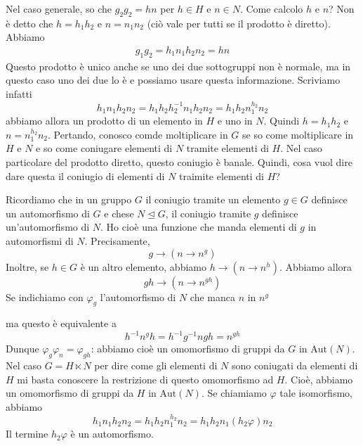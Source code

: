 \documentclass[a4paper]{article}
\begin{document}
Nel caso generale, so che \(g_2g_2 = hn\)
per \(h\in H\) e \(n\in N\).
Come calcolo \(h\) e \(n\)? Non è detto che \(h=h_1h_2\)
e \(n=n_1n_2\) (ciò vale per tutti se il prodotto è diretto).
Abbiamo
\begin{align*}
    g_1g_2 = h_1n_1h_2n_2 = hn
\end{align*}
Questo prodotto è unico anche se uno dei due sottogruppi non è normale,
ma in questo caso uno dei due lo è e possiamo usare questa informazione.
Scriviamo infatti
\[
    h_1 n_1 h_2 n_2 = h_1h_2h_2^{-1} n_1 h_2 n_2
    = h_1 h_2 n_1^{h_2} n_2
\]
abbiamo allora un prodotto di un elemento in \(H\) e uno in \(N\).
Quindi \(h = h_1h_2\) e \(n = n_1^{h_2}n_2\).
Pertando, conosco comde moltiplicare in \(G\)
se so come moltiplicare in \(H\) e \(N\)
e so come coniugare elementi di \(N\) tramite elementi
di \(H\).
Nel caso particolare del prodotto diretto, questo coniugio è banale.
Quindi, cosa vuol dire dare questa il coniugio
di elementi di \(N\) traimite elementi di \(H\)?

Ricordiamo che in un gruppo \(G\) il coniugio
tramite un elemento \(g\in G\) definisce un automorfismo
di \(G\) e chese \(N \unlhd G\), il coniugio tramite \(g\)
definisce un'automorfismo di \(N\).
Ho cioè una funzione che manda elementi di \(g\)
in automorfismi di \(N\).
Precisamente,
\[
    g\to (n \to n^g)
\]
Inoltre, se \(h\in G\) è un altro elemento, abbiamo
\(h \to (n \to n^h)\).
Abbiamo allora
\[
    gh \to (n \to n^{gh})
\]
Se indichiamo con \(\varphi_g\) l'automorfismo
di \(N\) che manca \(n\) in \(n^g\)

\begin{center}
\end{center}
ma questo è equivalente a
\[
    h^{-1} n^g h = h^{-1} g^{-1} ngh = n^{gh}
\]
Dunque \(\varphi_g \varphi_n = \varphi_{gh}\):
abbiamo cioè un omomorfismo di gruppi da \(G\) in \(\text{Aut}(N)\).
Nel caso \(G = H \ltimes N\)
per dire come gli elementi di \(N\) sono coniugati da elementi di \(H\)
mi basta conoscere la restrizione di questo omomorfismo ad \(H\).
Cioè, abbiamo un omomorfismo di gruppi da \(H\) in \(\text{Aut}(N)\).
Se chiamiamo \(\varphi\) tale isomorfismo, abbiamo
\[
    h_1n_1h_2n_2 = h_1h_2n_1^{h_2} n_2 = h_1h_2 n_1 (h_2 \varphi)n_2
\]
Il termine \(h_2\varphi\) è un automorfismo.
\end{document}
